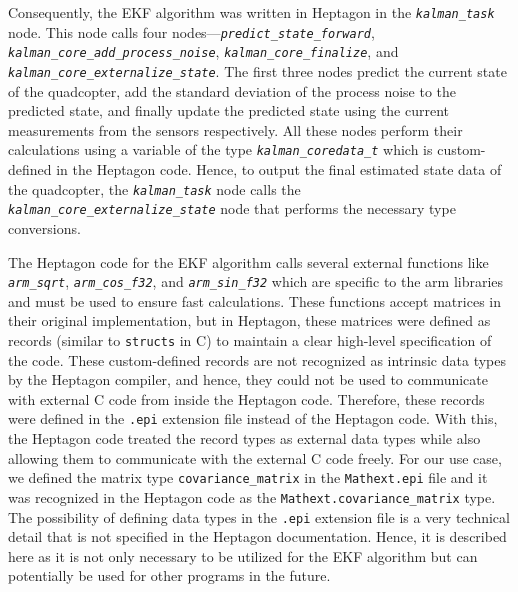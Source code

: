 \documentclass[10pt, a4paper]{article}
\newcommand{\textFunc}[1]{\texttt{\textit{#1}}}
\newcommand{\code}[1]{\texttt{#1}}
\begin{document}
    Consequently, the EKF algorithm was written in Heptagon in the \textFunc{kalman\_task} node. This node calls four nodes---\textFunc{predict\_state\_forward}, \textFunc{kalman\_core\_add\_process\_noise}, \textFunc{kalman\_core\_finalize}, and \textFunc{kalman\_core\_externalize\_state}. The first three nodes predict the current state of the quadcopter, add the standard deviation of the process noise to the predicted state, and finally update the predicted state using the current measurements from the sensors respectively. All these nodes perform their calculations using a variable of the type \textFunc{kalman\_coredata\_t} which is custom-defined in the Heptagon code. Hence, to output the final estimated state data of the quadcopter, the \textFunc{kalman\_task} node calls the \textFunc{kalman\_core\_externalize\_state} node that performs the necessary type conversions.
    
    The Heptagon code for the EKF algorithm calls several external functions like \textFunc{arm\_sqrt}, \textFunc{arm\_cos\_f32}, and \textFunc{arm\_sin\_f32} which are specific to the arm libraries and must be used to ensure fast calculations. These functions accept matrices in their original implementation, but in Heptagon, these matrices were defined as records (similar to \code{structs} in C) to maintain a clear high-level specification of the code. These custom-defined records are not recognized as intrinsic data types by the Heptagon compiler, and hence, they could not be used to communicate with external C code from inside the Heptagon code. Therefore, these records were defined in the \code{.epi} extension file instead of the Heptagon code. With this, the Heptagon code treated the record types as external data types while also allowing them to communicate with the external C code freely. For our use case, we defined the matrix type \code{covariance\_matrix} in the \code{Mathext.epi} file and it was recognized in the Heptagon code as the \code{Mathext.covariance\_matrix} type. The possibility of defining data types in the \code{.epi} extension file is a very technical detail that is not specified in the Heptagon documentation. Hence, it is described here as it is not only necessary to be utilized for the EKF algorithm but can potentially be used for other programs in the future.
\end{document}
